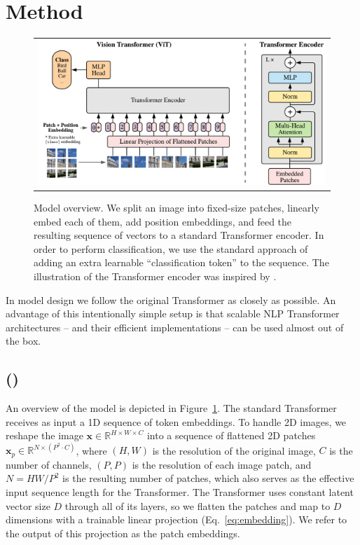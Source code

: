 \newcommand{\op}[1]{\operatorname{#1}}
\newcommand{\mbf}[1]{\mathbf{#1}}

\section{Method}

\begin{figure}[h]
\begin{center}
\begin{tabular}{c}
\includegraphics[width=.83\textwidth]{images/model_scheme.pdf}
\end{tabular}
\end{center}
\caption{Model overview. We split an image into fixed-size patches, linearly embed each of them, add position embeddings, and feed the resulting sequence of vectors to a standard Transformer encoder. In order to perform classification, we use the standard approach of adding an extra learnable ``classification token'' to the sequence. The illustration of the Transformer encoder was inspired by \citet{vaswani2017}.}
\label{fig:model}
\end{figure}

In model design we follow the original Transformer \citep{vaswani2017} as closely as possible. 
An advantage of this intentionally simple setup is that scalable NLP Transformer architectures -- and their efficient implementations -- can be used almost out of the box.

\subsection{\oursfull{} (\oursabbrv{})}\label{sec:patch_transformer}

An overview of the model is depicted in Figure~\ref{fig:model}.
The standard Transformer receives as input a 1D sequence of token embeddings.
To handle 2D images, we reshape the image $\mbf{x} \in \mathbb{R}^{H \times W \times C}$ into a sequence of flattened 2D patches $\mbf{x}_p \in \mathbb{R}^{N \times (P^2 \cdot C)}$, where $(H, W)$ is the resolution of the original image, $C$ is the number of channels, $(P,P)$ is the resolution of each image patch, and $N=HW/P^2$ is the resulting number of patches, which also serves as the effective input sequence length for the Transformer.
The Transformer uses constant latent vector size $D$ through all of its layers, so we flatten the patches and map to $D$ dimensions with a trainable linear projection (Eq.~\ref{eq:embedding}).
We refer to the output of this projection as the patch embeddings.


